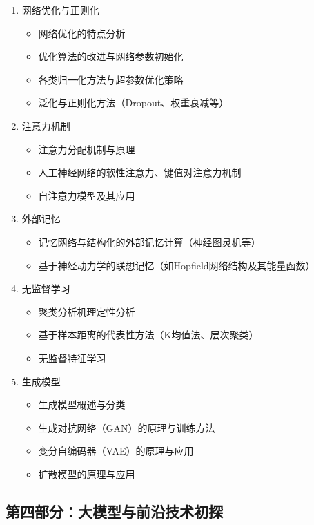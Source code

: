 \documentclass{../nndlcourse}
\begin{document}
\begin{enumerate}
    \item 网络优化与正则化
    \begin{itemize}
        \item 网络优化的特点分析
        \item 优化算法的改进与网络参数初始化
        \item 各类归一化方法与超参数优化策略
        \item 泛化与正则化方法（Dropout、权重衰减等）
    \end{itemize}
    \item 注意力机制
    \begin{itemize}
        \item 注意力分配机制与原理
        \item 人工神经网络的软性注意力、键值对注意力机制
        \item 自注意力模型及其应用
    \end{itemize}
    \item 外部记忆
    \begin{itemize}
        \item 记忆网络与结构化的外部记忆计算（神经图灵机等）
        \item 基于神经动力学的联想记忆（如Hopfield网络结构及其能量函数）
    \end{itemize}
    \item 无监督学习
    \begin{itemize}
        \item 聚类分析机理定性分析
        \item 基于样本距离的代表性方法（K均值法、层次聚类）
        \item 无监督特征学习
    \end{itemize}
	\item 生成模型 
	\begin{itemize}
		\item 生成模型概述与分类
		\item 生成对抗网络（GAN）的原理与训练方法
		\item 变分自编码器（VAE）的原理与应用
		\item 扩散模型的原理与应用
	\end{itemize}
\end{enumerate}

\subsection*{第四部分：大模型与前沿技术初探}
\end{document}
